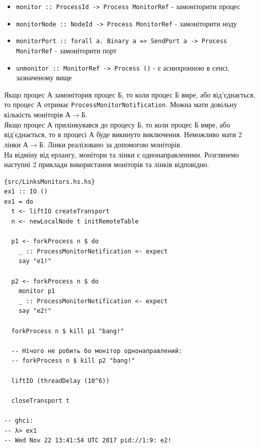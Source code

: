 \documentclass[12pt]{article}
\begin{document}
\begin{itemize}
    \item \lstinline{monitor :: ProcessId -> Process MonitorRef} - замоніторити процес
    \item \lstinline{monitorNode :: NodeId -> Process MonitorRef} - замоніторити ноду
    \item \lstinline{monitorPort :: forall a. Binary a => SendPort a -> Process MonitorRef} - замоніторити порт
    \item \lstinline{unmonitor :: MonitorRef -> Process ()} - є асинхронною в сенсі, зазначеному вище
\end{itemize}

Якщо процес А замоніторив процес Б, то коли процес Б вмре, або від'єднається, то процес А отримає \lstinline{ProcessMonitorNotification}. Можна мати довільну кількість моніторів $А \longrightarrow Б$.\\

Якщо процес А прилінкувався до процесу Б, то коли процес Б вмре, або від'єднається, то в процесі А буде викинуто виключення. Неможливо мати 2 лінки $А \longrightarrow Б$. Лінки реалізовано за допомогою моніторів\\

На відміну від ерлангу, монітори та лінки є однонаправленими. Розглянемо наступні 2 приклади використання моніторів та лінків відповідно.\\

\begin{lstlisting}{src/LinksMonitors.hs.hs}
ex1 :: IO ()
ex1 = do
  t <- liftIO createTransport
  n <- newLocalNode t initRemoteTable
  
  p1 <- forkProcess n $ do
    _ :: ProcessMonitorNotification <- expect
    say "e1!"
  
  p2 <- forkProcess n $ do
    monitor p1
    _ :: ProcessMonitorNotification <- expect
    say "e2!"

  forkProcess n $ kill p1 "bang!"
  
  -- Нічого не робить бо монітор однонаправлений:
  -- forkProcess n $ kill p2 "bang!"
  
  liftIO (threadDelay (10^6))
  
  closeTransport t

-- ghci:
-- λ> ex1
-- Wed Nov 22 13:41:54 UTC 2017 pid://1:9: e2!
\end{lstlisting}
\end{document}
